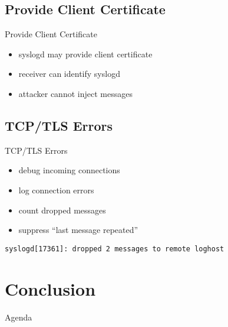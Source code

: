 \documentclass[14pt]{beamer}
\begin{document}
\subsection{Provide Client Certificate}
\begin{frame}{Provide Client Certificate}
\begin{itemize}
    \item syslogd may provide client certificate
    \item receiver can identify syslogd
    \item attacker cannot inject messages
\end{itemize}
\end{frame}

\subsection{TCP/TLS Errors}
\begin{frame}{TCP/TLS Errors}
\begin{itemize}
    \item debug incoming connections
    \item log connection errors
    \item count dropped messages
    \item suppress ``last message repeated''
\end{itemize}
    \texttt{syslogd[17361]:\ dropped 2 messages to remote loghost}
\end{frame}

\section{Conclusion}

\begin{frame}{Agenda}
\tableofcontents[currentsection]
\end{frame}
\end{document}
